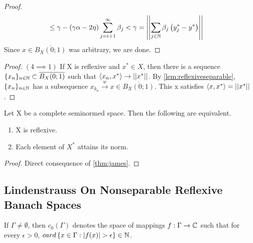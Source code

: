 \begin{thm}[James]
\begin{proof}
\begin{equation}
\begin{split}
                & \leq \gamma - \left( \gamma \alpha - 2 \eta\right) \sum_{j=i+1}^{\infty} \beta_j < \gamma = \left|\left| \sum_{j \in \mathbb{N}} \beta_j \left( y_j^*-y^*\right) \right|\right|
            \end{split}
        \end{equation}
        Since $x \in \overline{B_X(0;1)}$ was arbitrary, we are done. 
    \end{proof}
    \begin{proof} $(4 \implies 1)$
        If X is reflexive and $x^* \in X$, then there is a sequence $\{x_n\}_{n \in \mathbb{N}} \subset \overline{B_X(0;1)}$ such that $\left\langle x_n,x^* \right\rangle \to \left|\left| x^* \right|\right|$.  By  \ref{lem:reflexiveseparable}, $\{x_n\}_{n \in \mathbb{N}}$ has a subsequence $x_{k_n} \overset{w}{\to} x \in \overline{B_X(0;1)}$. This x satisfies $\left\langle x,x^* \right\rangle = \left|\left| x^* \right|\right|$. 
    \end{proof} 
\end{thm} 

\begin{cor} Let X be a complete seminormed  space. Then the following are equivalent. 
    \begin{enumerate}
        \item X is reflexive.
        \item Each element of $X^*$ attains its norm. 
    \end{enumerate}
    \begin{proof}
        Direct consequence of \ref{thm:james}.
    \end{proof} 
\end{cor} 




\subsection{Lindenstrauss On Nonseparable Reflexive Banach Spaces}
If $\Gamma \neq \emptyset$, then $c_0(\Gamma)$ denotes the space of mappings $f:\Gamma \to \mathbb{C}$ such that for every $\epsilon > 0$, $card\left\{x \in \Gamma : |f(x)|>\epsilon\right\} \in \N$. 
